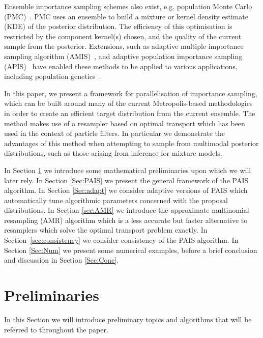\documentclass[final]{siamltex}
\begin{document}
Ensemble importance sampling schemes also exist, e.g. population Monte Carlo (PMC)~\cite{cappe2012population}. PMC uses an ensemble to build a mixture or kernel density estimate (KDE) of the
posterior distribution. The efficiency of
this optimisation is restricted by the component kernel(s) chosen, and
the quality of the current sample from the posterior. Extensions, such
as adaptive multiple importance sampling algorithm
(AMIS)~\cite{cornuet2012adaptive}, and adaptive population importance sampling
(APIS)~\cite{martino2015adaptive} have enabled these methods to be
applied to various applications, including population
genetics~\cite{siren2011reconstructing}.

In this paper, we present a framework for parallelisation of
importance sampling, which can be built around many of the current
Metropolis-based methodologies in order to create an efficient target
distribution from the current
ensemble. The method makes use of a resampler based on optimal
transport which has been used in the context of particle
filters\cite{reich2013nonparametric}. In particular we demonstrate the
advantages of this method when attempting to sample from multimodal
posterior distributions, such as those arising from inference for
mixture models.

In Section \ref{Sec:Prelim} we introduce some mathematical
preliminaries upon which we will later rely. In Section \ref{Sec:PAIS}
we present the general framework of the PAIS algorithm. In Section
\ref{Sec:adapt} we consider adaptive versions of PAIS which
automatically tune algorithmic parameters concerned with the proposal
distributions. In Section \ref{sec:AMR} we introduce the approximate
multinomial resampling (AMR) algorithm which is a less accurate but
faster alternative to resamplers which solve the optimal transport
problem exactly. In Section~\ref{sec:consistency} we consider
consistency of the PAIS algorithm. In Section \ref{Sec:Num} we present
some numerical examples, before a brief conclusion and discussion in
Section \ref{Sec:Conc}.


\section{Preliminaries}\label{Sec:Prelim}

In this Section we will introduce preliminary topics and algorithms
that will be referred to throughout the paper.

\end{document}
